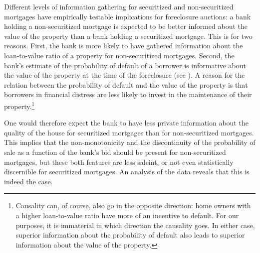 \documentclass[11pt,twopage]{article}
\begin{document}
Different levels of information gathering for securitized and non-securitized mortgages have empirically testable implications for foreclosure auctions: a bank holding a non-securitized mortgage is expected to be better informed about the value of the property than a bank holding a securitized mortgage. This is for two reasons. First, the bank is more likely to have gathered information about the loan-to-value ratio of a property for non-securitized mortgages. Second, the bank's estimate of the probability of default of a borrower is informative about the value of the property at the time of the foreclosure (see \cite{qi2009loss}). A reason for the relation between the probability of default and the value of the property is that borrowers in financial distress are less likely to invest in the maintenance of their property.\footnote{Causality can, of course, also go in the opposite direction: home owners with a higher loan-to-value ratio have more of an incentive to default. For our purposes, it is immaterial in which direction the causality goes. In either case, superior information about the probability of default also leads to superior information about the value of the property.} %

One would therefore
expect the bank to have less private information about the quality of the house for securitized
mortgages than for non-securitized mortgages. This implies that the non-monotonicity and the discontinuity of the probability of sale as a function of the bank's bid should be present for non-securitized mortgages, but these both features are less saleint, or not even statistically discernible for securitized mortgages. An analysis of the data reveals that this is indeed the case.
\end{document}
